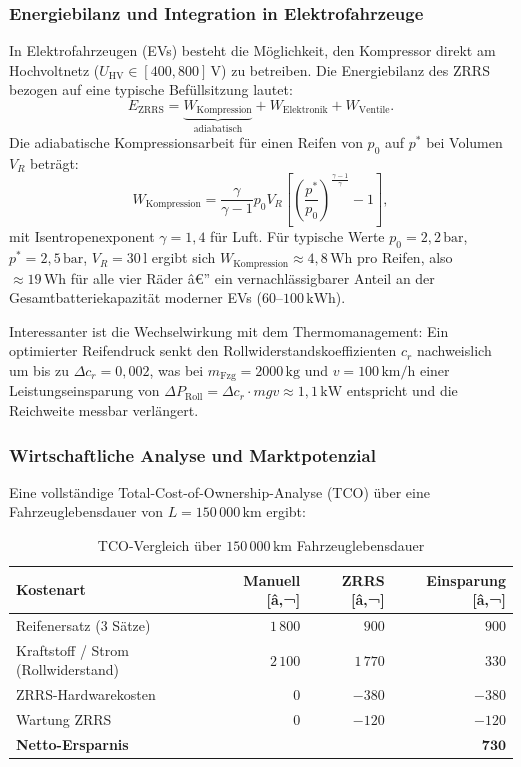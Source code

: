 ﻿\documentclass[a4paper,12pt]{article}
\theoremstyle{definition}
\begin{document}
\subsubsection{Energiebilanz und Integration in Elektrofahrzeuge}

In Elektrofahrzeugen (EVs) besteht die Möglichkeit, den Kompressor direkt
am Hochvoltnetz ($U_{\text{HV}} \in [400, 800]\,\text{V}$) zu betreiben.
Die Energiebilanz des ZRRS bezogen auf eine typische Befüllsitzung lautet:
\[
    E_{\text{ZRRS}} = \underbrace{W_{\text{Kompression}}}_{\text{adiabatisch}}
    + W_{\text{Elektronik}} + W_{\text{Ventile}}.
\]
Die adiabatische Kompressionsarbeit für einen Reifen von $p_0$ auf $p^*$ bei
Volumen $V_R$ beträgt:
\[
    W_{\text{Kompression}}
    = \frac{\gamma}{\gamma - 1} p_0 V_R
    \left[\left(\frac{p^*}{p_0}\right)^{\!\frac{\gamma-1}{\gamma}} - 1\right],
\]
mit Isentropenexponent $\gamma = 1{,}4$ für Luft. Für typische Werte
$p_0 = 2{,}2\,\text{bar}$, $p^* = 2{,}5\,\text{bar}$, $V_R = 30\,\text{l}$ ergibt
sich $W_{\text{Kompression}} \approx 4{,}8\,\text{Wh}$ pro Reifen, also
$\approx 19\,\text{Wh}$ für alle vier Räder â€” ein vernachlässigbarer Anteil
an der Gesamtbatteriekapazität moderner EVs ($60$--$100\,\text{kWh}$).

Interessanter ist die Wechselwirkung mit dem Thermomanagement: Ein
optimierter Reifendruck senkt den Rollwiderstandskoeffizienten $c_r$ nachweislich
um bis zu $\Delta c_r = 0{,}002$, was bei $m_{\text{Fzg}} = 2000\,\text{kg}$ und
$v = 100\,\text{km/h}$ einer Leistungseinsparung von
$\Delta P_{\text{Roll}} = \Delta c_r \cdot m g v \approx 1{,}1\,\text{kW}$ entspricht
und die Reichweite messbar verlängert.

\subsubsection{Wirtschaftliche Analyse und Marktpotenzial}

Eine vollständige Total-Cost-of-Ownership-Analyse (TCO) über eine
Fahrzeuglebensdauer von $L = 150\,000\,\text{km}$ ergibt:

\begin{table}[H]
\centering
\caption{TCO-Vergleich über $150\,000\,\text{km}$ Fahrzeuglebensdauer}
\label{tab:tco}
\begin{tabular}{lrrr}
\toprule
\textbf{Kostenart} & \textbf{Manuell [â‚¬]} & \textbf{ZRRS [â‚¬]} & \textbf{Einsparung [â‚¬]} \\
\midrule
Reifenersatz (3 Sätze) & $1\,800$ & $900$ & $900$ \\
Kraftstoff / Strom (Rollwiderstand) & $2\,100$ & $1\,770$ & $330$ \\
ZRRS-Hardwarekosten & $0$ & $-380$ & $-380$ \\
Wartung ZRRS & $0$ & $-120$ & $-120$ \\
\midrule
\textbf{Netto-Ersparnis} & & & $\mathbf{730}$ \\
\bottomrule
\end{tabular}
\end{table}
\end{document}
